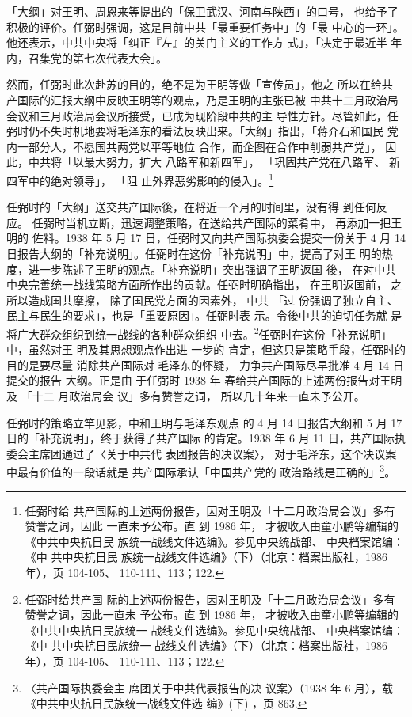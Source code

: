 「大纲」对王明、周恩来等提出的「保卫武汉、河南与陕西」的口号， 也给予了
积极的评价。任弼时强调，这是目前中共「最重要任务中」的「最 中心的一环」。
他还表示，中共中央将「纠正『左』的关门主义的工作方 式」，「决定于最近半
年内，召集党的第七次代表大会」。

然而，任弼时此次赴苏的目的，绝不是为王明等做「宣传员」，他之 所以在给共
产国际的汇报大纲中反映王明等的观点，乃是王明的主张已被 中共十二月政治局
会议和三月政治局会议所接受，已成为现阶段中共的主 导性方针。尽管如此，任
弼时仍不失时机地要将毛泽东的看法反映出来。「大纲」指出，「蒋介石和国民
党内一部分人，不愿国共两党以平等地位 合作，而企图在合作中削弱共产党」，
因此，中共将「以最大努力，扩大 八路军和新四军」， 「巩固共产党在八路军、
新四军中的绝对领导」， 「阻 止外界恶劣影响的侵入」。\footnote{任弼时给
共产国际的上述两份报告，因对王明及「十二月政治局会议」多有赞誉之词，因此
一直未予公布。直 到 1986 年， 才被收入由童小鹏等编辑的 《中共中央抗日民
族统一战线文件选编》。参见中央统战部、 中央档案馆编： 《中 共中央抗日民
族统一战线文件选编》（下）（北京：档案出版社，1986 年），页 104-105、
110-111、113；122.  }

任弼时的「大纲」送交共产国际後，在将近一个月的时间里，没有得 到任何反应。
任弼时当机立断，迅速调整策略，在送给共产国际的菜肴中， 再添加一把王明的
佐料。1938 年 5 月 17 日，任弼时又向共产国际执委会提交一份关于 4 月 14
日报告大纲的「补充说明」。任弼时在这份「补充说明」中，提高了对王 明的热
度，进一步陈述了王明的观点。「补充说明」突出强调了王明返国 後， 在对中共
中央完善统一战线策略方面所作出的贡献。任弼时明确指出， 在王明返国前，
之所以造成国共摩擦， 除了国民党方面的因素外， 中共 「过 份强调了独立自主、
民主与民生的要求」，也是「重要原因」。任弼时表 示。令後中共的迫切任务就
是将广大群众组织到统一战线的各种群众组织 中去。\footnote{任弼时给共产国
际的上述两份报告，因对王明及「十二月政治局会议」多有赞誉之词，因此一直未
予公布。直 到 1986 年， 才被收入由童小鹏等编辑的 《中共中央抗日民族统一
战线文件选编》。参见中央统战部、 中央档案馆编： 《中 共中央抗日民族统一
战线文件选编》（下）（北京：档案出版社，1986 年），页 104-105、
110-111、113；122.   }任弼时在这份「补充说明」中，虽然对王 明及其思想观点作出进 一步的
肯定，但这只是策略手段，任弼时的目的是要尽量 消除共产国际对 毛泽东的怀疑，
力争共产国际尽早批准 4 月 14 日提交的报告 大纲。正是由 于任弼时 1938 年
春给共产国际的上述两份报告对王明及 「十二 月政治局会 议」多有赞誉之词，
所以几十年来一直未予公开。

任弼时的策略立竿见影，中和王明与毛泽东观点 的 4 月 14
日报告大纲和 5 月 17 日的「补充说明」，终于获得了共产国际 的肯定。1938
年 6 月 11 日，共产国际执委会主席团通过了〈关于中共代 表团报告的决议案〉，
对于毛泽东，这个决议案中最有价值的一段话就是 共产国际承认「中国共产党的
政治路线是正确的」\footnote{〈共产国际执委会主 席团关于中共代表报告的决
议案〉（1938 年 6 月），载《中共中央抗日民族统一战线文件选 编》(下)
，页 863.  }。


